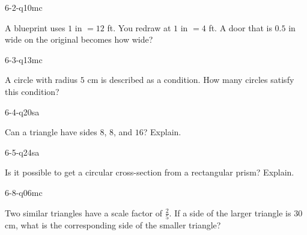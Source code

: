 \begin{practiceQuestion}{6-2-q10}{mc}
\begin{questionText}
A blueprint uses $1$ in $= 12$ ft. You redraw at $1$ in $= 4$ ft. A door that is $0.5$ in wide on the original becomes how wide?
\end{questionText}
\end{practiceQuestion}

\begin{practiceQuestion}{6-3-q13}{mc}
\begin{questionText}
A circle with radius $5$ cm is described as a condition. How many circles satisfy this condition?
\end{questionText}
\end{practiceQuestion}

\begin{practiceQuestion}{6-4-q20}{sa}
\begin{questionText}
Can a triangle have sides $8$, $8$, and $16$? Explain.
\end{questionText}
\end{practiceQuestion}

\begin{practiceQuestion}{6-5-q24}{sa}
\begin{questionText}
Is it possible to get a circular cross-section from a rectangular prism? Explain.
\end{questionText}
\end{practiceQuestion}

\begin{practiceQuestion}{6-8-q06}{mc}
\begin{questionText}
Two similar triangles have a scale factor of $\frac{2}{5}$. If a side of the larger triangle is $30$ cm, what is the corresponding side of the smaller triangle?
\end{questionText}
\end{practiceQuestion}

